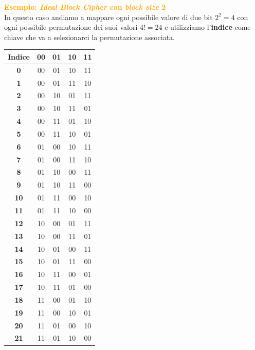 \begin{boxA}
    \textcolor{orange}{\textbf{Esempio: \textit{Ideal Block Cipher} con \textit{block size} 2}} \\
    In questo caso andiamo a mappare ogni possibile valore di due bit $2^2 = 4$ con ogni possibile permutazione dei suoi valori $4! = 24$ e utilizziamo l'\textbf{indice} come chiave che va a selezionarci la permutazione associata.
    \begin{center}
        \renewcommand{\arraystretch}{0.7}
        \begin{tabular}{c|cccc}
            \textbf{Indice} & \textbf{00} & \textbf{01} & \textbf{10} & \textbf{11} \\ \hline
            \textbf{0}  & 00 & 01 & 10 & 11 \\
            \textbf{1}  & 00 & 01 & 11 & 10 \\
            \textbf{2}  & 00 & 10 & 01 & 11 \\
            \textbf{3}  & 00 & 10 & 11 & 01 \\
            \textbf{4}  & 00 & 11 & 01 & 10 \\
            \textbf{5}  & 00 & 11 & 10 & 01 \\
            \textbf{6}  & 01 & 00 & 10 & 11 \\
            \textbf{7}  & 01 & 00 & 11 & 10 \\
            \textbf{8}  & 01 & 10 & 00 & 11 \\
            \textbf{9}  & 01 & 10 & 11 & 00 \\
            \textbf{10} & 01 & 11 & 00 & 10 \\
            \textbf{11} & 01 & 11 & 10 & 00 \\
            \textbf{12} & 10 & 00 & 01 & 11 \\
            \textbf{13} & 10 & 00 & 11 & 01 \\
            \textbf{14} & 10 & 01 & 00 & 11 \\
            \textbf{15} & 10 & 01 & 11 & 00 \\
            \textbf{16} & 10 & 11 & 00 & 01 \\
            \textbf{17} & 10 & 11 & 01 & 00 \\
            \textbf{18} & 11 & 00 & 01 & 10 \\
            \textbf{19} & 11 & 00 & 10 & 01 \\
            \textbf{20} & 11 & 01 & 00 & 10 \\
            \textbf{21} & 11 & 01 & 10 & 00 \\

\end{tabular}
\end{center}
\end{boxA}
